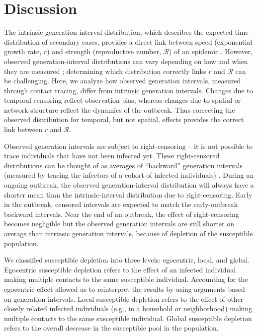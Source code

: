 \documentclass[12pt]{article}
\newcommand{\RR}{\ensuremath{{\mathcal R}}}
\begin{document}
\section{Discussion}

The intrinsic generation-interval distribution, which describes the expected time distribution of secondary cases, provides a direct link between speed (exponential growth rate, $r$) and strength (reproductive number, $\RR$) of an epidemic \citep{wallinga2007generation, svensson2007note, svensson2015influence, park2019practical}.
However, observed generation-interval distributions can vary depending on how and when they are measured \citep{nishiura2010time, tomba2010some, champredon2015intrinsic, britton2019estimation};
determining which distribution correctly links $r$ and $\RR$ can be challenging.
Here, we analyze how observed generation intervals, measured through contact tracing, differ from intrinsic generation intervals.
Changes due to temporal censoring reflect observation bias, whereas changes due to spatial or network structure reflect the dynamics of the outbreak.
Thus correcting the observed distribution for temporal, but not spatial, effects provides the correct link between $r$ and $\RR$.

Observed generation intervals are subject to right-censoring -- it is not possible to trace individuals that have not been infected yet.
These right-censored distributions can be thought of as averages of ``backward'' generation intervals (measured by tracing the infectors of a cohort of infected individuals) \citep{kenah2008generation, nishiura2010time, tomba2010some, champredon2015intrinsic, britton2019estimation}.
During an ongoing outbreak, the observed generation-interval distribution will always have a shorter mean than the intrinsic-interval distribution due to right-censoring.
Early in the outbreak, censored intervals are expected to match the early-outbreak backward intervals.
Near the end of an outbreak, the effect of right-censoring becomes negligible but the observed generation intervals are still shorter on average than intrinsic generation intervals, because of depletion of the susceptible population.

We classified susceptible depletion into three levels: egocentric, local, and global.
Egocentric susceptible depletion refers to the effect of an infected individual making multiple contacts to the same susceptible individual.
Accounting for the egocentric effect allowed us to reinterpret the results by \cite{trapman2016inferring} using arguments based on generation intervals.
Local susceptible depletion refers to the effect of other closely related infected individuals (e.g., in a household or neighborhood) making multiple contacts to the same susceptible individual.
Global susceptible depletion refers to the overall decrease in the susceptible pool in the population.
\end{document}
